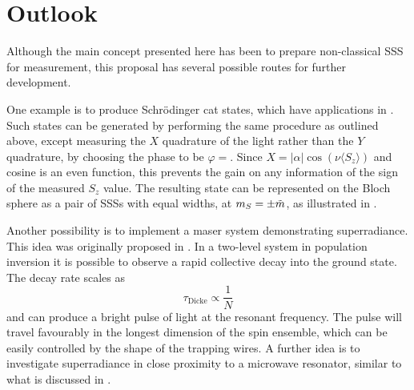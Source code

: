 \section{Outlook}

Although the main concept presented here has been to prepare non-classical SSS
for measurement, this proposal has several possible routes for further
development.

One example is to produce Schr\"odinger cat states, which have applications in
. Such states can be generated by performing the same procedure as
outlined above, except measuring the $X$ quadrature of the light rather than
the $Y$ quadrature, by choosing the phase to be $\varphi=$. Since $X =
|\alpha|\cos(\nu \langle S_z \rangle)$ and cosine is an even function, this
prevents the gain on any information of the sign of the measured $S_z$ value.
The resulting state can be represented on the Bloch sphere as a pair of SSSs
with equal widths, at $m_S=\pm\tilde{m}$, as illustrated in .

Another possibility is to implement a maser system demonstrating superradiance.
This idea was originally proposed in \inlineref{}. %
In a two-level system in population inversion it is possible to observe
a rapid collective decay into the ground state. The decay rate scales as
%
\begin{equation}
  \tau_\text{Dicke} \propto \frac{1}{N}
\end{equation}
% 
and can produce a bright pulse of light at the resonant frequency. The pulse
will travel favourably in the longest dimension of the spin ensemble, which can
be easily controlled by the shape of the trapping wires. A further idea is to
investigate superradiance in close proximity to a microwave resonator, similar
to what is discussed in \inlineref{}.




